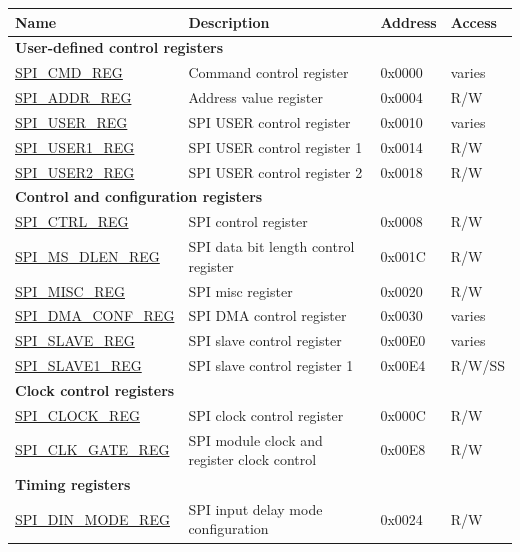 \begin{longtable}{ | p{6cm} | p{7.2cm} | p{1.3cm} | p{1cm} | }
\hline\rowcolor{lightgray}
\textbf{Name} & \textbf{Description} &  \textbf{Address} & \textbf{Access} \\ \hline
\endhead
\multicolumn{4}{|l|}{\textbf{User-defined control registers}} \\ \hline
\hyperref[regdesc:SPICMDREG]{SPI\_CMD\_REG} & Command control register & 0x0000 & varies \\ \hline
\hyperref[regdesc:SPIADDRREG]{SPI\_ADDR\_REG} & Address value register & 0x0004 & R/W \\ \hline
\hyperref[regdesc:SPIUSERREG]{SPI\_USER\_REG} & SPI USER control register & 0x0010 & varies \\ \hline
\hyperref[regdesc:SPIUSER1REG]{SPI\_USER1\_REG} & SPI USER control register 1 & 0x0014 & R/W \\ \hline
\hyperref[regdesc:SPIUSER2REG]{SPI\_USER2\_REG} & SPI USER control register 2 & 0x0018 & R/W \\ \hline
\multicolumn{4}{|l|}{\textbf{Control and configuration registers}} \\ \hline
\hyperref[regdesc:SPICTRLREG]{SPI\_CTRL\_REG} & SPI control register & 0x0008 & R/W \\ \hline
\hyperref[regdesc:SPIMSDLENREG]{SPI\_MS\_DLEN\_REG} & SPI data bit length control register & 0x001C & R/W \\ \hline
\hyperref[regdesc:SPIMISCREG]{SPI\_MISC\_REG} & SPI misc register & 0x0020 & R/W \\ \hline
\hyperref[regdesc:SPIDMACONFREG]{SPI\_DMA\_CONF\_REG} & SPI DMA control register & 0x0030 & varies \\ \hline
\hyperref[regdesc:SPISLAVEREG]{SPI\_SLAVE\_REG} & SPI slave control register & 0x00E0 & varies \\ \hline
\hyperref[regdesc:SPISLAVE1REG]{SPI\_SLAVE1\_REG} & SPI slave control register 1 & 0x00E4 & R/W/SS \\ \hline
\multicolumn{4}{|l|}{\textbf{Clock control registers}} \\ \hline
\hyperref[regdesc:SPICLOCKREG]{SPI\_CLOCK\_REG} & SPI clock control register & 0x000C & R/W \\ \hline
\hyperref[regdesc:SPICLKGATEREG]{SPI\_CLK\_GATE\_REG} & SPI module clock and register clock control & 0x00E8 & R/W \\ \hline
\multicolumn{4}{|l|}{\textbf{Timing registers}} \\ \hline
\hyperref[regdesc:SPIDINMODEREG]{SPI\_DIN\_MODE\_REG} & SPI input delay mode configuration & 0x0024 & R/W \\ \hline

\end{longtable}
